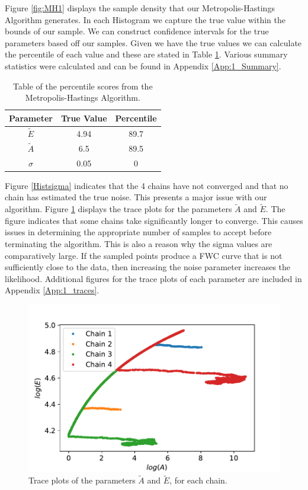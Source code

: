 Figure \ref{fig:MH1} displays the sample density that our Metropolis-Hastings Algorithm generates. In each Histogram we capture the true value within the bounds of our sample. We can construct confidence intervals for the true parameters based off our samples. Given we have the true values we can calculate the percentile of each value and these are stated in Table \ref{tab:MH1}. Various summary statistics were calculated and can be found in Appendix \ref{App:1_Summary}.\\ 
\begin{table}[h!]
\centering
\begin{tabular}{|c|c|c|}
\hline 
Parameter & True Value & Percentile \\
\hline
$\tilde{E}$ & 4.94 & 89.7 \\
\hline
$\tilde{A}$ & 6.5 & 89.5 \\
\hline
$\sigma$ & 0.05 & 0\\
\hline
\end{tabular}
\caption{Table of the percentile scores from the Metropolis-Hastings Algorithm.}
\label{tab:MH1}
\end{table}

Figure \ref{Histsigma} indicates that the 4 chains have not converged and that no chain has estimated the true noise. This presents a major issue with our algorithm. Figure \ref{fig:trace1} displays the trace plots for the parameters $\tilde{A}$ and $\tilde{E}$. The figure indicates that some chains take significantly longer to converge. This causes issues in determining the appropriate number of samples to accept before terminating the algorithm. This is also a reason why the sigma values are comparatively large. If the sampled points produce a FWC curve that is not sufficiently close to the data, then increasing the noise parameter increases the likelihood. Additional figures for the trace plots of each parameter are included in Appendix \ref{App:1_traces}.
\begin{figure}[h!]
\centering
\includegraphics[width=\linewidth]{figures/bayesian/trace_plots.pdf}
\caption{Trace plots of the parameters $\tilde{A}$ and $\tilde{E}$, for each chain.}
\label{fig:trace1}
\end{figure}

